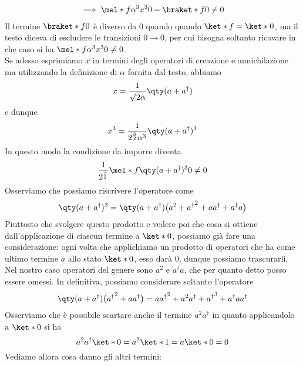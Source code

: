 \begin{soluzione}
\begin{gather*}
      \implies
      \mel*{f}{\alpha^3 x^3}{0} - \braket*{f}{0}
      \neq 0
   \end{gather*}
   Il termine $\braket*{f}{0}$ è diverso da 0 quando quando $\ket*{f}=\ket*{0}$, ma il testo diceva di escludere le transizioni $0 \to 0$, per cui bisogna soltanto ricavare in che caso si ha $\mel*{f}{\alpha^3 x^3}{0} \neq 0$.\\
   Se adesso esprimiamo $x$ in termini degli operatori di creazione e annichilazione ma utilizzando la definizione di $\alpha$ fornita dal testo, abbiamo
   \begin{equation*}
      x=\frac{1}{\sqrt{2} \alpha} \qty( a + a^{\dag} )
   \end{equation*}
   e dunque
   \begin{equation*}
      x^3
      =\frac{1}{2^{\frac{3}{2}} \alpha^3} \qty( a + a^{\dag} )^3
   \end{equation*}
   In questo modo la condizione da imporre diventa
   \begin{equation*}
      \frac{1}{2^{\frac{3}{2}}} \mel*{f}{\qty( a + a^{\dag} )^3}{0}
      \neq 0
   \end{equation*}
   Osserviamo che possiamo riscrivere l'operatore come
   \begin{equation*}
      \qty( a + a^{\dag} )^3
      =\qty( a + a^{\dag} ) \bigl( a^2 + {a^{\dag}}^2 + aa^{\dag} + a^{\dag}a \bigr)
   \end{equation*}
   Piuttosto che svolgere questo prodotto e vedere poi che cosa si ottiene dall'applicazione di ciascun termine a $\ket*{0}$, possiamo già fare una considerazione: ogni volta che applichiamo un prodotto di operatori che ha come ultimo termine $a$ allo stato $\ket*{0}$, esso darà $0$, dunque possiamo trascurarli. Nel nostro caso operatori del genere sono $a^2$ e $a^{\dag} a$, che per quanto detto posso essere omessi. In definitiva, possiamo considerare soltanto l'operatore
   \begin{equation*}
      \qty( a + a^{\dag} ) \bigl( {a^{\dag}}^2 + aa^{\dag} \bigr)
      =a{a^{\dag}}^2 + a^2 a^{\dag} + {a^{\dag}}^3 + a^{\dag} a a^{\dag}
   \end{equation*}
   Osserviamo che è possibile scartare anche il termine $a^2 a^{\dag}$ in quanto applicandolo a $\ket*{0}$ si ha
   \begin{equation*}
      a^2 a^{\dag}\ket*{0}
      =a^2 \ket*{1}
      =a \ket*{0}
      =0
   \end{equation*}
   Vediamo allora cosa danno gli altri termini:
   \begin{equation*}

\end{equation*}
\end{soluzione}
